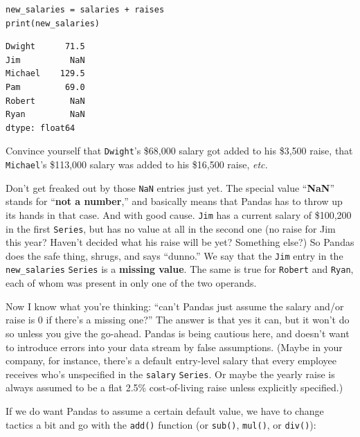 \begin{Verbatim}[fontsize=\small,samepage=true,frame=single,framesep=3mm]
new_salaries = salaries + raises
print(new_salaries)
\end{Verbatim}

\begin{Verbatim}[fontsize=\small,samepage=true,frame=leftline,framesep=5mm,framerule=1mm]
Dwight      71.5
Jim          NaN
Michael    129.5
Pam         69.0
Robert       NaN
Ryan         NaN
dtype: float64
\end{Verbatim}


Convince yourself that \texttt{Dwight}'s \$68,000 salary got added to his
\$3,500 raise, that \texttt{Michael}'s \$113,000 salary was added to his
\$16,500 raise, \textit{etc.}

\label{NaN}

Don't get freaked out by those \texttt{NaN} entries just yet. The special value
``\textbf{NaN}'' stands for ``\textbf{not a number},'' and basically means that
Pandas has to throw up its hands in that case. And with good cause.
\texttt{Jim} has a current salary of \$100,200 in the first \texttt{Series},
but has no value at all in the second one (no raise for Jim this year? Haven't
decided what his raise will be yet? Something else?) So Pandas does the safe
thing, shrugs, and says ``dunno.'' We say that the \texttt{Jim} entry in the
\texttt{new\_salaries} \texttt{Series} is a \textbf{missing value}. The same is
true for \texttt{Robert} and \texttt{Ryan}, each of whom was present in only
one of the two operands.

Now I know what you're thinking: ``can't Pandas just assume the salary and/or
raise is 0 if there's a missing one?'' The answer is that yes it can, but it
won't do so unless you give the go-ahead. Pandas is being cautious here, and
doesn't want to introduce errors into your data stream by false assumptions.
(Maybe in your company, for instance, there's a default entry-level salary that
every employee receives who's unspecified in the \texttt{salary}
\texttt{Series}. Or maybe the yearly raise is always assumed to be a flat 2.5\%
cost-of-living raise unless explicitly specified.)


If we do want Pandas to assume a certain default value, we have to change
tactics a bit and go with the \texttt{add()} function (or \texttt{sub()},
\texttt{mul()}, or \texttt{div()}):

